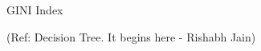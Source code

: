 



\begin{frame}[fragile]\frametitle{}
\begin{center}
{\Large GINI Index}
\end{center}

{\tiny (Ref: Decision Tree. It begins here - Rishabh Jain)}

\end{frame}

